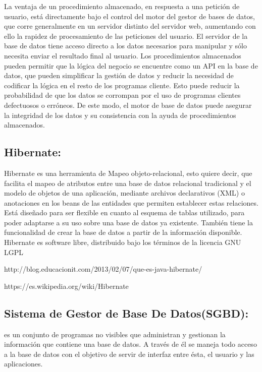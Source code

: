 \documentclass[spanish]{article}
\begin{document}
La ventaja de un procedimiento almacenado, en respuesta a una petición de usuario, está directamente bajo el control del motor del gestor de bases de datos, que corre generalmente en un servidor distinto del servidor web, aumentando con ello la rapidez de procesamiento de las peticiones del usuario. El servidor de la base de datos tiene acceso directo a los datos necesarios para manipular y sólo necesita enviar el resultado final al usuario. Los procedimientos almacenados pueden permitir que la lógica del negocio se encuentre como un API en la base de datos, que pueden simplificar la gestión de datos y reducir la necesidad de codificar la lógica en el resto de los programas cliente. Esto puede reducir la probabilidad de que los datos se corrompan por el uso de programas clientes defectuosos o erróneos. De este modo, el motor de base de datos puede asegurar la integridad de los datos y su consistencia con la ayuda de procedimientos almacenados.


\subsection{Hibernate:}

Hibernate es una herramienta de Mapeo objeto-relacional, esto quiere decir, que facilita el mapeo de atributos entre una base de datos relacional tradicional y el modelo de objetos de una aplicación, mediante archivos declarativos (XML) o anotaciones en los beans de las entidades que permiten establecer estas relaciones. \\
Está diseñado para ser flexible en cuanto al esquema de tablas utilizado, para poder adaptarse a su uso sobre una base de datos ya existente. También tiene la funcionalidad de crear la base de datos a partir de la información disponible. \\

Hibernate es software libre, distribuido bajo los términos de la licencia GNU LGPL

http://blog.educacionit.com/2013/02/07/que-es-java-hibernate/

https://es.wikipedia.org/wiki/Hibernate


\subsection{Sistema de Gestor de Base De Datos(SGBD):}

es un conjunto de programas no visibles que administran y gestionan la información que contiene una base de datos. A través de él se maneja todo acceso a la base de datos con el objetivo de servir de interfaz entre ésta, el usuario y las aplicaciones.
\end{document}
